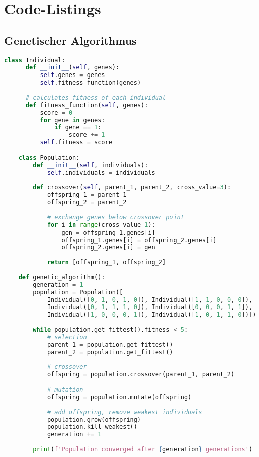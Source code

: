 \chapter{Code-Listings}

\section{Genetischer Algorithmus}

\begin{lstlisting}[language=Python, caption=Genetischer Algorithmus (Python)]
    class Individual:
      def __init__(self, genes):
          self.genes = genes
          self.fitness_function(genes)
      
      # calculates fitness of each individual
      def fitness_function(self, genes):
          score = 0
          for gene in genes:
              if gene == 1:
                  score += 1
          self.fitness = score
    
    class Population:
        def __init__(self, individuals):
            self.individuals = individuals
        
        def crossover(self, parent_1, parent_2, cross_value=3):
            offspring_1 = parent_1
            offspring_2 = parent_2
            
            # exchange genes below crossover point
            for i in range(cross_value-1):
                gen = offspring_1.genes[i]
                offspring_1.genes[i] = offspring_2.genes[i]
                offspring_2.genes[i] = gen
            
            return [offspring_1, offspring_2]
    
    def genetic_algorithm():
        generation = 1
        population = Population([
            Individual([0, 1, 0, 1, 0]), Individual([1, 1, 0, 0, 0]),
            Individual([0, 1, 1, 1, 0]), Individual([0, 0, 0, 1, 1]),
            Individual([1, 0, 0, 0, 1]), Individual([1, 0, 1, 1, 0])])
    
        while population.get_fittest().fitness < 5:
            # selection
            parent_1 = population.get_fittest()
            parent_2 = population.get_fittest()
    
            # crossover
            offspring = population.crossover(parent_1, parent_2)
    
            # mutation
            offspring = population.mutate(offspring)
    
            # add offspring, remove weakest individuals
            population.grow(offspring)
            population.kill_weakest()
            generation += 1
    
        print(f'Population converged after {generation} generations')
    \end{lstlisting}

